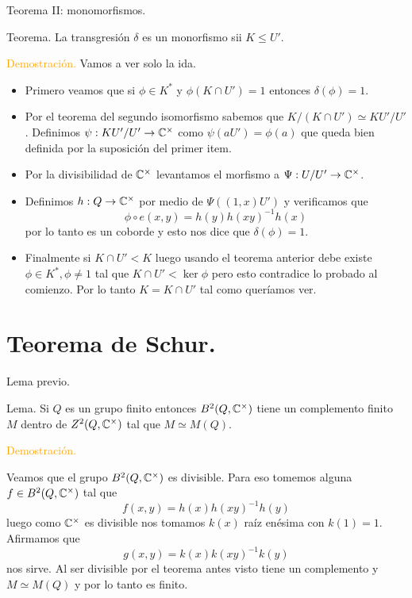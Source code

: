\documentclass[aspectratio=169, 9pt]{beamer}
\begin{document}
\begin{frame}[fragile]{Teorema II: monomorfismos.}
\begin{alertblock}{Teorema.}
La transgresión $\delta$ es un monorfismo sii $K \le U'$.
\end{alertblock}
\textcolor{orange}{Demostración.} Vamos a ver solo la ida.
\begin{itemize}
	\item Primero veamos que si $\phi \in K^*$ y $\phi(K \cap U')=1$ entonces $\delta(\phi)=1$.
	\pause
	\item Por el teorema del segundo isomorfismo sabemos que $K/(K\cap U') \simeq KU'/U'$. Definimos $\psi:KU'/U' \to \Bbb C^\times$ como $\psi(aU')=\phi(a)$ que queda bien definida por la suposición del primer item.
	\pause
	\item Por la divisibilidad de $\Bbb C^\times$ levantamos el morfismo a $\Psi: U/U' \to \Bbb C^\times$.
	\pause
	\item Definimos $h:Q \to \Bbb C^\times$ por medio de $\Psi((1,x)U')$ y verificamos que \begin{equation*}
		\phi \circ e(x,y) = h(y)h(xy)^{-1}h(x)
	\end{equation*}
	por lo tanto es un coborde y esto nos dice que $\delta(\phi) = 1$.
	\pause
	\item Finalmente si $K \cap U' < K$ luego usando el teorema anterior debe existe $\phi \in K^*, \phi \neq 1$ tal que $K\cap U' < \ker \phi$ pero esto contradice lo probado al comienzo. Por lo tanto $K = K \cap U'$ tal como queríamos ver.
\end{itemize}
\end{frame}


\section[Teorema de Schur.]{Teorema de Schur.}

\begin{frame}[fragile]{Lema previo.}
\begin{alertblock}{Lema.}
Si $Q$ es un grupo finito entonces $B^2(Q, \Bbb C^\times)$ tiene un complemento finito $M$ dentro de $Z^2(Q,\Bbb C^\times)$ tal que $M \simeq M(Q)$.
\end{alertblock}
\textcolor{orange}{Demostración.}

Veamos que el grupo $B^2(Q, \Bbb C^\times)$ es divisible. \pause
Para eso tomemos alguna $f \in B^2(Q,\Bbb C^\times)$ tal que
\[
f(x,y) = h(x)h(xy)^{-1}h(y)
\]
\pause
luego como $\Bbb C^\times$ es divisible nos tomamos $k(x)$ raíz enésima con $k(1)=1$. Afirmamos que 
\[
g(x,y) = k(x)k(xy)^{-1}k(y)
\]
nos sirve. \pause Al ser divisible por el teorema antes visto tiene un complemento y $M \simeq M(Q)$ y por lo tanto es finito.
\end{frame}
\end{document}
